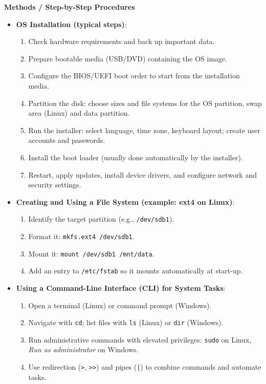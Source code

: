 \documentclass[11pt]{article}
\begin{document}
\begin{bilan}
\textbf{Methods / Step-by-Step Procedures}
\begin{itemize}
\item \textbf{OS Installation (typical steps)}:
  \begin{enumerate}
  \item Check hardware requirements and back up important data.
  \item Prepare bootable media (USB/DVD) containing the OS image.
  \item Configure the BIOS/UEFI boot order to start from the installation media.
  \item Partition the disk: choose sizes and file systems for the OS partition, swap area (Linux) and data partition.
  \item Run the installer: select language, time zone, keyboard layout; create user accounts and passwords.
  \item Install the boot loader (usually done automatically by the installer).
  \item Restart, apply updates, install device drivers, and configure network and security settings.
  \end{enumerate}
\item \textbf{Creating and Using a File System (example: ext4 on Linux)}:
  \begin{enumerate}
  \item Identify the target partition (e.g., \texttt{/dev/sdb1}).
  \item Format it: \texttt{mkfs.ext4 /dev/sdb1}.
  \item Mount it: \texttt{mount /dev/sdb1 /mnt/data}.
  \item Add an entry to \texttt{/etc/fstab} so it mounts automatically at start-up.
  \end{enumerate}
\item \textbf{Using a Command-Line Interface (CLI) for System Tasks}:
  \begin{enumerate}
  \item Open a terminal (Linux) or command prompt (Windows).
  \item Navigate with \texttt{cd}; list files with \texttt{ls} (Linux) or \texttt{dir} (Windows).
  \item Run administrative commands with elevated privileges: \texttt{sudo} on Linux, \emph{Run as administrator} on Windows.
  \item Use redirection (\texttt{>}, \texttt{>>}) and pipes (\texttt{|}) to combine commands and automate tasks.
  \end{enumerate}
\end{itemize}


\end{bilan}
\end{document}
